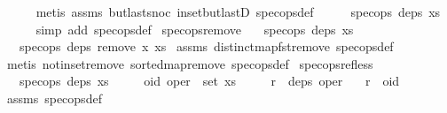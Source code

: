 \begin{isabellebody}
\ \ \ \ \isamarkupfalse%
\ {\isacharparenleft}metis\ assms\ butlast{\isacharunderscore}snoc\ in{\isacharunderscore}set{\isacharunderscore}butlastD\ spec{\isacharunderscore}ops{\isacharunderscore}def{\isacharparenright}\isanewline
\ \ \isamarkupfalse%
\ \isamarkupfalse%
\ {\isachardoublequoteopen}spec{\isacharunderscore}ops\ deps\ xs{\isachardoublequoteclose}\isanewline
\ \ \ \ \isamarkupfalse%
\ {\isacharparenleft}simp\ add{\isacharcolon}\ spec{\isacharunderscore}ops{\isacharunderscore}def{\isacharparenright}\isanewline
{}\isamarkupfalse%
%
\endisatagproof
{\isafoldproof}%
%
\isadelimproof
\isanewline
%
\endisadelimproof
\isanewline
{}\isamarkupfalse%
\ spec{\isacharunderscore}ops{\isacharunderscore}remove{}{\isacharcolon}\isanewline
\ \ \ {\isachardoublequoteopen}spec{\isacharunderscore}ops\ deps\ xs{\isachardoublequoteclose}\isanewline
\ \ \ {\isachardoublequoteopen}spec{\isacharunderscore}ops\ deps\ {\isacharparenleft}remove{}\ x\ xs{\isacharparenright}{\isachardoublequoteclose}\isanewline
%
\isadelimproof
%
\endisadelimproof
%
\isatagproof
{}\isamarkupfalse%
\ assms\ distinct{\isacharunderscore}map{\isacharunderscore}fst{\isacharunderscore}remove{}\ spec{\isacharunderscore}ops{\isacharunderscore}def\isanewline
{}\isamarkupfalse%
\ {\isacharparenleft}metis\ notin{\isacharunderscore}set{\isacharunderscore}remove{}\ sorted{\isacharunderscore}map{\isacharunderscore}remove{}\ spec{\isacharunderscore}ops{\isacharunderscore}def{\isacharparenright}%
\endisatagproof
{\isafoldproof}%
%
\isadelimproof
\isanewline
%
\endisadelimproof
\isanewline
{}\isamarkupfalse%
\ spec{\isacharunderscore}ops{\isacharunderscore}ref{\isacharunderscore}less{\isacharcolon}\isanewline
\ \ \ {\isachardoublequoteopen}spec{\isacharunderscore}ops\ deps\ xs{\isachardoublequoteclose}\isanewline
\ \ \ \ \ {\isachardoublequoteopen}{\isacharparenleft}oid{\isacharcomma}\ oper{\isacharparenright}\ {\isasymin}\ set\ xs{\isachardoublequoteclose}\isanewline
\ \ \ \ \ {\isachardoublequoteopen}r\ {\isasymin}\ deps\ oper{\isachardoublequoteclose}\isanewline
\ \ \ {\isachardoublequoteopen}r\ {\isacharless}\ oid{\isachardoublequoteclose}\isanewline
%
\isadelimproof
%
\endisadelimproof
%
\isatagproof
{}\isamarkupfalse%
\ assms\ spec{\isacharunderscore}ops{\isacharunderscore}def\ \isamarkupfalse%

\end{isabellebody}
